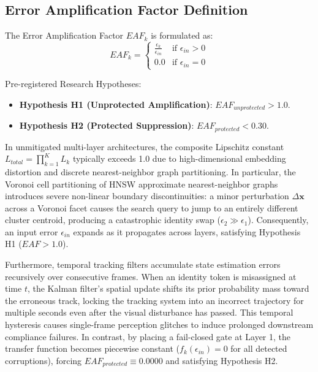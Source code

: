 \documentclass[conference]{IEEEtran}
\begin{document}
\subsection{Error Amplification Factor Definition}
The Error Amplification Factor $EAF_k$ is formulated as:
\begin{equation}
EAF_k = \begin{cases}
\frac{\epsilon_k}{\epsilon_{in}} & \text{if } \epsilon_{in} > 0 \\
0.0 & \text{if } \epsilon_{in} = 0
\end{cases}
\end{equation}

Pre-registered Research Hypotheses:
\begin{itemize}
    \item \textbf{Hypothesis H1 (Unprotected Amplification)}: $EAF_{unprotected} > 1.0$.
    \item \textbf{Hypothesis H2 (Protected Suppression)}: $EAF_{protected} < 0.30$.
\end{itemize}

In unmitigated multi-layer architectures, the composite Lipschitz constant $L_{total} = \prod_{k=1}^K L_k$ typically exceeds 1.0 due to high-dimensional embedding distortion and discrete nearest-neighbor graph partitioning. In particular, the Voronoi cell partitioning of HNSW approximate nearest-neighbor graphs introduces severe non-linear boundary discontinuities: a minor perturbation $\Delta \mathbf{x}$ across a Voronoi facet causes the search query to jump to an entirely different cluster centroid, producing a catastrophic identity swap ($\epsilon_2 \gg \epsilon_1$). Consequently, an input error $\epsilon_{in}$ expands as it propagates across layers, satisfying Hypothesis H1 ($EAF > 1.0$).

Furthermore, temporal tracking filters accumulate state estimation errors recursively over consecutive frames. When an identity token is misassigned at time $t$, the Kalman filter's spatial update shifts its prior probability mass toward the erroneous track, locking the tracking system into an incorrect trajectory for multiple seconds even after the visual disturbance has passed. This temporal hysteresis causes single-frame perception glitches to induce prolonged downstream compliance failures. In contrast, by placing a fail-closed gate at Layer 1, the transfer function becomes piecewise constant ($f_k(\epsilon_{in}) = 0$ for all detected corruptions), forcing $EAF_{protected} \equiv 0.0000$ and satisfying Hypothesis H2.
\end{document}
